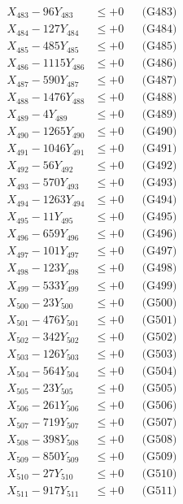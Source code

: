 \documentclass[a4paper,10pt]{article}
\begin{document}
{\begin{align}
X_{483} - 96Y_{483} &\leq +0 && \text{(G483)} \\
X_{484} - 127Y_{484} &\leq +0 && \text{(G484)} \\
X_{485} - 485Y_{485} &\leq +0 && \text{(G485)} \\
X_{486} - 1115Y_{486} &\leq +0 && \text{(G486)} \\
X_{487} - 590Y_{487} &\leq +0 && \text{(G487)} \\
X_{488} - 1476Y_{488} &\leq +0 && \text{(G488)} \\
X_{489} - 4Y_{489} &\leq +0 && \text{(G489)} \\
X_{490} - 1265Y_{490} &\leq +0 && \text{(G490)} \\
\allowbreak
X_{491} - 1046Y_{491} &\leq +0 && \text{(G491)} \\
X_{492} - 56Y_{492} &\leq +0 && \text{(G492)} \\
X_{493} - 570Y_{493} &\leq +0 && \text{(G493)} \\
X_{494} - 1263Y_{494} &\leq +0 && \text{(G494)} \\
X_{495} - 11Y_{495} &\leq +0 && \text{(G495)} \\
X_{496} - 659Y_{496} &\leq +0 && \text{(G496)} \\
X_{497} - 101Y_{497} &\leq +0 && \text{(G497)} \\
X_{498} - 123Y_{498} &\leq +0 && \text{(G498)} \\
X_{499} - 533Y_{499} &\leq +0 && \text{(G499)} \\
X_{500} - 23Y_{500} &\leq +0 && \text{(G500)} \\
\allowbreak
X_{501} - 476Y_{501} &\leq +0 && \text{(G501)} \\
X_{502} - 342Y_{502} &\leq +0 && \text{(G502)} \\
X_{503} - 126Y_{503} &\leq +0 && \text{(G503)} \\
X_{504} - 564Y_{504} &\leq +0 && \text{(G504)} \\
X_{505} - 23Y_{505} &\leq +0 && \text{(G505)} \\
X_{506} - 261Y_{506} &\leq +0 && \text{(G506)} \\
X_{507} - 719Y_{507} &\leq +0 && \text{(G507)} \\
X_{508} - 398Y_{508} &\leq +0 && \text{(G508)} \\
X_{509} - 850Y_{509} &\leq +0 && \text{(G509)} \\
X_{510} - 27Y_{510} &\leq +0 && \text{(G510)} \\
\allowbreak
X_{511} - 917Y_{511} &\leq +0 && \text{(G511)} \\

\end{align}}
\end{document}
